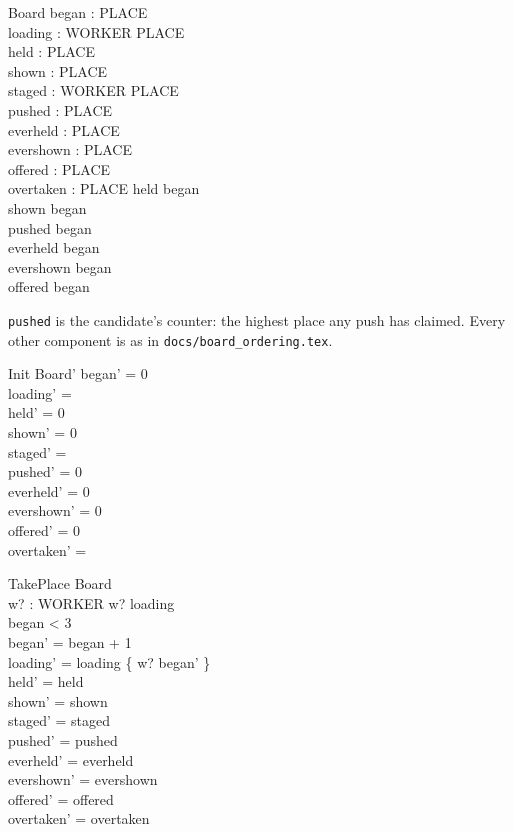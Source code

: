 \documentclass[a4paper,10pt,fleqn]{article}
\begin{document}
\begin{schema}{Board}
  began : PLACE \\
  loading : WORKER \pfun PLACE \\
  held : PLACE \\
  shown : PLACE \\
  staged : WORKER \pfun PLACE \\
  pushed : PLACE \\
  everheld : PLACE \\
  evershown : PLACE \\
  offered : PLACE \\
  overtaken : \power PLACE
\where
  held \leq began \\
  shown \leq began \\
  pushed \leq began \\
  everheld \leq began \\
  evershown \leq began \\
  offered \leq began
\end{schema}

\texttt{pushed} is the candidate's counter: the highest place any push has
claimed. Every other component is as in \texttt{docs/board\_ordering.tex}.

\begin{schema}{Init}
  Board'
\where
  began' = 0 \\
  loading' = \emptyset \\
  held' = 0 \\
  shown' = 0 \\
  staged' = \emptyset \\
  pushed' = 0 \\
  everheld' = 0 \\
  evershown' = 0 \\
  offered' = 0 \\
  overtaken' = \emptyset
\end{schema}

\begin{schema}{TakePlace}
  \Delta Board \\
  w? : WORKER
\where
  w? \notin \dom loading \\
  began < 3 \\
  began' = began + 1 \\
  loading' = loading \cup \{ w? \mapsto began' \} \\
  held' = held \\
  shown' = shown \\
  staged' = staged \\
  pushed' = pushed \\
  everheld' = everheld \\
  evershown' = evershown \\
  offered' = offered \\
  overtaken' = overtaken
\end{schema}
\end{document}
